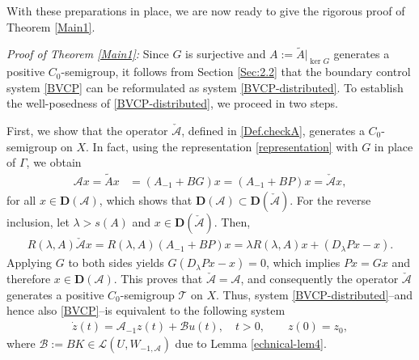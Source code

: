 \documentclass[onecolumn]{autart}
\def\calL{{\mathcal{L}}}
\def\calT{{\mathcal{T}}}
\def\calB{{\mathcal{B}}}
\def\calA{{\mathcal{A}}}
\numberwithin{equation}{section}
\begin{document}
   With these preparations in place, we are now ready to give the rigorous proof of Theorem \ref{Main1}.

    \emph{Proof of Theorem \ref{Main1}:\enspace}
		Since $G$ is surjective and $A := \tilde{A}|_{\ker G}$ generates a positive $C_0$-semigroup, it follows from Section \ref{Sec:2.2} that the boundary control system \eqref{BVCP} can be reformulated as  system \eqref{BVCP-distributed}. To establish the well-posedness of \eqref{BVCP-distributed}, we proceed in two steps.
		
		First, we show that the operator $\check{\calA}$, defined in \eqref{Def.checkA}, generates a $C_0$-semigroup on $X$. In fact, using the representation \eqref{representation} with $G$ in place of $\Gamma$, we obtain
		\begin{align*}
			\calA x = \tilde{A} x &= (A_{-1} + B G)x
			= (A_{-1} + B P)x
			= \check{\calA} x,
		\end{align*}
		for all $x \in {\bm D}(\calA)$, which shows that ${\bm D}(\calA) \subset {\bm D}(\check{\calA})$. For the reverse inclusion, let $\lambda > s(A)$ and $x \in {\bm D}(\check{\calA})$. Then,
		\begin{align*}
			R(\lambda, A) \check{\calA} x
			= R(\lambda, A)(A_{-1} + B P)x
			= \lambda R(\lambda, A)x + (D_\lambda P x-x).
		\end{align*}
		Applying $G$ to both sides yields $G(D_\lambda P x-x) = 0$, which implies $Px=Gx$ and therefore $x \in {\bm D}(\calA)$. This proves that $\check{\calA} = \calA$, and consequently the operator $\check{\calA}$ generates a positive $C_0$-semigroup $\calT$ on $X$. %
        Thus,  system \eqref{BVCP-distributed}--and hence also \eqref{BVCP}--is equivalent to the following system
		\begin{align}\label{Cauchy-problem}
			\dot{z}(t) = \calA_{-1} z(t) + \calB u(t), \quad t > 0,\qquad z(0)={z_0},
		\end{align}
		where $\calB:=BK\in \calL(U, W_{-1, \calA})$ due to Lemma \ref{echnical-lem4}.
		
\end{document}
